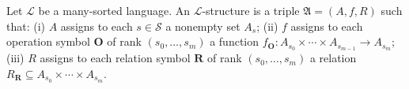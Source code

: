 Let $\mathcal{L}$ be a many-sorted language. An $\mathcal{L}$-structure is a triple $\mathfrak{A} = (A, f, R)$ such that:
(i) $A$ assigns to each $s \in \mathcal{S}$ a nonempty set $A_s$;
(ii) $f$ assigns to each operation symbol $\mathbf{O}$ of rank $(s_0, \ldots, s_m)$ a function $f_{\mathbf{O}} : A_{s_0} \times \cdots \times A_{s_{m-1}} \rightarrow A_{s_m}$;
(iii) $R$ assigns to each relation symbol $\mathbf{R}$ of rank $(s_0, \ldots, s_m)$ a relation $R_{\mathbf{R}} \subseteq A_{s_0} \times \cdots \times A_{s_m}$.
